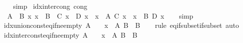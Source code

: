 \begin{isabellebody}
%
\isadelimproof
\ \ %
\endisadelimproof
%
\isatagproof
{}\isamarkupfalse%
\ simp%
\endisatagproof
{\isafoldproof}%
%
\isadelimproof
\isanewline
%
\endisadelimproof
\isanewline
{}\isamarkupfalse%
\ idx{\isacharunderscore}{\kern0pt}inter{\isacharunderscore}{\kern0pt}cong\ {\isacharbrackleft}{\kern0pt}cong{\isacharbrackright}{\kern0pt}{\isacharcolon}{\kern0pt}\isanewline
\ \ {\isachardoublequoteopen}{\isasymlbrakk}A\ {\isacharequal}{\kern0pt}\ B{\isacharsemicolon}{\kern0pt}\ {\isasymAnd}x{\isachardot}{\kern0pt}\ x\ {\isasymin}\ B\ {\isasymLongrightarrow}\ C\ x\ {\isacharequal}{\kern0pt}\ D\ x{\isasymrbrakk}\ {\isasymLongrightarrow}\ {\isacharparenleft}{\kern0pt}{\isasymInter}x\ {\isasymin}\ A{\isachardot}{\kern0pt}\ C\ x{\isacharparenright}{\kern0pt}\ {\isacharequal}{\kern0pt}\ {\isacharparenleft}{\kern0pt}{\isasymInter}x\ {\isasymin}\ B{\isachardot}{\kern0pt}\ D\ x{\isacharparenright}{\kern0pt}{\isachardoublequoteclose}\isanewline
%
\isadelimproof
\ \ %
\endisadelimproof
%
\isatagproof
{}\isamarkupfalse%
\ simp%
\endisatagproof
{\isafoldproof}%
%
\isadelimproof
\isanewline
%
\endisadelimproof
\isanewline
{}\isamarkupfalse%
\ idx{\isacharunderscore}{\kern0pt}union{\isacharunderscore}{\kern0pt}const{\isacharunderscore}{\kern0pt}eq{\isacharunderscore}{\kern0pt}if{\isacharunderscore}{\kern0pt}ne{\isacharunderscore}{\kern0pt}empty{\isacharcolon}{\kern0pt}\ {\isachardoublequoteopen}A\ {\isasymnoteq}\ {\isacharbraceleft}{\kern0pt}{\isacharbraceright}{\kern0pt}\ {\isasymLongrightarrow}\ {\isacharparenleft}{\kern0pt}{\isasymUnion}x\ {\isasymin}\ A{\isachardot}{\kern0pt}\ B{\isacharparenright}{\kern0pt}\ {\isacharequal}{\kern0pt}\ B{\isachardoublequoteclose}\isanewline
%
\isadelimproof
\ \ %
\endisadelimproof
%
\isatagproof
{}\isamarkupfalse%
\ {\isacharparenleft}{\kern0pt}rule\ eq{\isacharunderscore}{\kern0pt}if{\isacharunderscore}{\kern0pt}subset{\isacharunderscore}{\kern0pt}if{\isacharunderscore}{\kern0pt}subset{\isacharparenright}{\kern0pt}\ auto%
\endisatagproof
{\isafoldproof}%
%
\isadelimproof
\isanewline
%
\endisadelimproof
\isanewline
{}\isamarkupfalse%
\ idx{\isacharunderscore}{\kern0pt}inter{\isacharunderscore}{\kern0pt}const{\isacharunderscore}{\kern0pt}eq{\isacharunderscore}{\kern0pt}if{\isacharunderscore}{\kern0pt}ne{\isacharunderscore}{\kern0pt}empty{\isacharcolon}{\kern0pt}\ {\isachardoublequoteopen}A\ {\isasymnoteq}\ {\isacharbraceleft}{\kern0pt}{\isacharbraceright}{\kern0pt}\ {\isasymLongrightarrow}\ {\isacharparenleft}{\kern0pt}{\isasymInter}x\ {\isasymin}\ A{\isachardot}{\kern0pt}\ B{\isacharparenright}{\kern0pt}\ {\isacharequal}{\kern0pt}\ B{\isachardoublequoteclose}\isanewline

\end{isabellebody}
